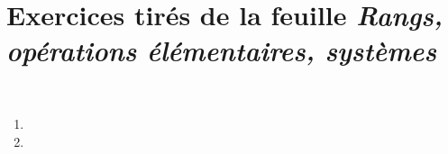 

\section*{Exercices tirés de la feuille \emph{Rangs, opérations élémentaires, systèmes}}
\
\begin{enumerate}
  \item  
  \item 
\end{enumerate}

